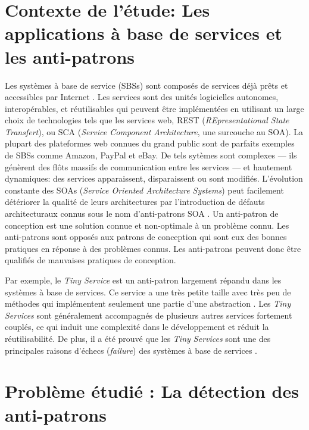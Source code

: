 \begin{introduction}

\section*{Contexte de l'\'etude: Les applications \`a base de services et les anti-patrons}

Les syst\`emes \`a base de service (SBSs) sont compos\'es de services d\'ej\`a pr\^ets et accessibles par Internet \citep{Erl2008}.
Les services sont des unit\'es logicielles autonomes, interop\'erables, et r\'eutilisables qui peuvent \^etre impl\'ement\'ees en utilisant un large choix de technologies tels que les services web, REST (\textit{REpresentational State Transfert}), ou SCA (\textit{Service Component Architecture}, une surcouche au SOA).
La plupart des plateformes web connues du grand public sont de parfaits exemples de SBSs comme Amazon, PayPal et eBay.
De tels syt\`emes sont complexes --- ils g\'en\`erent des fl\^ots massifs de communication entre les services --- et hautement dynamiques: des services apparaissent, disparaissent ou sont modifi\'es.
L'\'evolution constante des SOAs (\textit{Service Oriented Architecture Systems}) peut facilement d\'et\'eriorer la qualit\'e de leurs architectures par l'introduction de d\'efauts architecturaux connus sous le nom d'anti-patrons SOA \citep{Moha}.
Un anti-patron de conception est une solution connue et non-optimale \`a un probl\`eme connu.
Les anti-patrons sont oppos\'es aux patrons de conception qui sont eux des bonnes pratiques en r\'eponse \`a des probl\`emes connus.
Les anti-patrons peuvent donc \^etre qualifi\'es de mauvaises pratiques de conception.

Par exemple, le \textit{Tiny Service} est un anti-patron  largement r\'epandu dans les syst\`emes \`a base de services.
Ce service a une tr\`es petite taille avec tr\`es peu de m\'ethodes qui impl\'ementent seulement une partie d'une abstraction \citep{Dudney2003}.
Les \textit{Tiny Services} sont g\'en\'eralement accompagn\'es de plusieurs autres services fortement coupl\'es, ce qui induit une complexit\'e dans le d\'eveloppement et r\'eduit la r\'eutilisabilit\'e.
De plus, il a \'et\'e prouv\'e que les \textit{Tiny Services} sont une des principales raisons d'\'echecs (\textit{failure}) des syst\`emes \`a base de services \citep{Kral2009}.


\section*{Probl\`eme \'etudi\'e : La d\'etection des anti-patrons}


\end{introduction}
